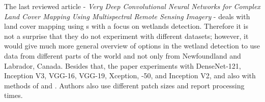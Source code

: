 
The last reviewed article - \textit{Very Deep Convolutional Neural Networks for Complex Land Cover Mapping Using Multispectral Remote Sensing Imagery} - deals with land cover mapping using s with a focus on wetlands detection. Therefore it is not a surprise that they do not experiment with different datasets; however, it would give much more general overview of  options in the wetland detection to use data from different parts of the world and not only from Newfoundland and Labrador, Canada. Besides that, the paper experiments with DenseNet-121, Inception V3, VGG-16, VGG-19, Xception, -50, and Inception  V2, and also with  methods of  and . Authors also use different patch sizes and report processing times.


